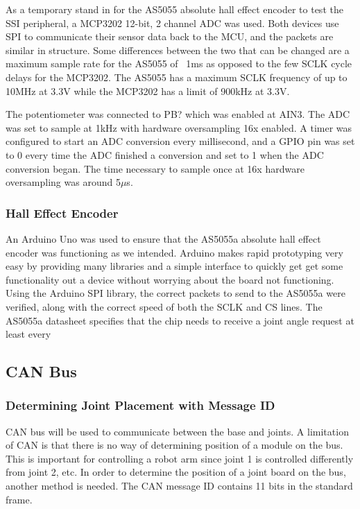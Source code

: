 \noindent As a temporary stand in for the AS5055 absolute hall effect encoder to test the SSI peripheral, a MCP3202 12-bit, 2 channel ADC was used. Both devices use SPI to communicate their sensor data back to the MCU, and the packets are similar in structure. Some differences between the two that can be changed are a maximum sample rate for the AS5055 of ~1ms as opposed to the few SCLK cycle delays for the MCP3202. The AS5055 has a maximum SCLK frequency of up to 10MHz at 3.3V while the MCP3202 has a limit of 900kHz at 3.3V. 

\noindent The potentiometer was connected to PB? which was enabled at AIN3. The ADC was set to sample at 1kHz with hardware oversampling 16x enabled. A timer was configured to start an ADC conversion every millisecond, and a GPIO pin was set to 0 every time the ADC finished a conversion and set to 1 when the ADC conversion began. The time necessary to sample once at 16x hardware oversampling was around 5$\mu$s.

\subsubsection{Hall Effect Encoder}
An Arduino Uno was used to ensure that the AS5055a absolute hall effect encoder was functioning as we intended. Arduino makes rapid prototyping very easy by providing many libraries and a simple interface to quickly get get some functionality out a device without worrying about the board not functioning. Using the Arduino SPI library, the correct packets to send to the AS5055a were verified, along with the correct speed of both the SCLK and CS lines. The AS5055a datasheet specifies that the chip needs to receive a joint angle request at least every

\subsection{CAN Bus}
\subsubsection{Determining Joint Placement with Message ID}
CAN bus will be used to communicate between the base and joints. A limitation of CAN is that there is no way of determining position of a module on the bus. This is important for controlling a robot arm since joint 1 is controlled differently from joint 2, etc. In order to determine the position of a joint board on the bus, another method is needed. The CAN message ID contains 11 bits in the standard frame.


